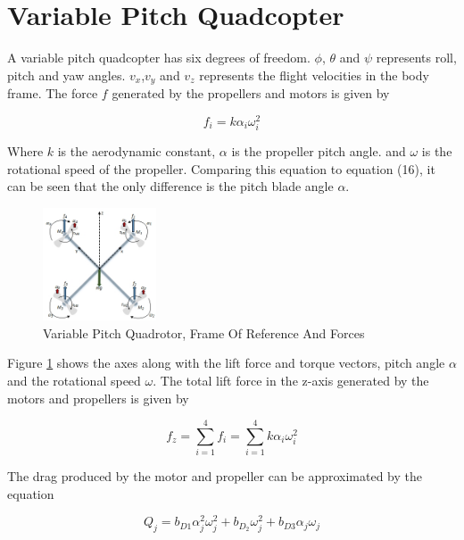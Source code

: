 \newpage
\section{Variable Pitch Quadcopter}

A variable pitch quadcopter has six degrees of freedom. $\phi$, $\theta$ and $\psi$ represents roll, pitch and yaw angles. $v_x$,$v_y$ and $v_z$ represents the flight velocities in the body frame. The force $f$ generated by the propellers and motors is given by

\begin{equation}
    f_{i} = k\alpha_i\omega_i^2
\end{equation}

Where $k$ is the aerodynamic constant,  $\alpha$ is the propeller pitch angle. and $\omega$ is the rotational speed of the propeller. Comparing this equation to equation (16), it can be seen that the only difference is the pitch blade angle $\alpha$.

\begin{figure}[H]
    \centering
    \includegraphics[width = 0.3\textwidth]{VAPIQ-PICTURES/MMVPQ.jpg}
    \caption{Variable Pitch Quadrotor, Frame Of Reference And Forces}
    \label{fig:ControllInputs}
\end{figure}

Figure \ref{fig:ControllInputs} shows the axes along with the lift force and torque vectors, pitch angle $\alpha$ and the rotational speed $\omega$. The total lift force in the z-axis generated by the motors and propellers is given by

\begin{equation}
   f_{z} = \sum_{i=1}^{4} f_{i} = \sum_{i=1}^{4} k\alpha_i\omega_i^2
\end{equation}

The drag produced by the motor and propeller can be approximated by the equation

\begin{equation}
   Q_j = b_{D1}\alpha_j^2\omega_j^2 + b_D_2\omega_j^2 + b_{D3}\alpha_j\omega_j
\end{equation}


